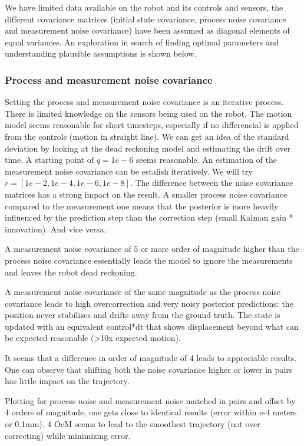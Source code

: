 \documentclass{article}
\begin{document}
We have limited data available on the robot and its controls and sensors, the different covariance matrices (initial state covariance, process noise covariance and measurement noise covariance) have been assumed as diagonal elements of equal variances. An exploration in search of finding optimal parameters and understanding plausible assumptions is shown below. 


\subsubsection{Process and measurement noise covariance}
Setting the process and measurement noise covariance is an iterative process. There is limited knowledge on the sensors being used on the robot. The motion model seems reasonable for short timesteps, especially if no differencial is applied from the controls (motion in straight line). We can get an idea of the standard deviation by looking at the dead reckoning model and estimating the drift over time.
A starting point of $q=1e-6$ seems reasonable.
An estimation of the measurement noise covariance can be estalish iteratively. We will try $r=[1e-2, 1e-4, 1e-6, 1e-8]$.
The difference between the noise covariance matrices has a strong impact on the result. A smaller process noise covariance compared to the measurement one means that the posterior is more heavily influenced by the prediction step than the correction step (small Kalman gain * innovation). And vice versa.

A measurement noise covariance of 5 or more order of magnitude higher than the process noise covariance essentially leads the model to ignore the measurements and leaves the robot dead reckoning.

A measurement noise covariance of the same magnitude as the process noise covariance leads to high overcorrection and very noisy posterior predictions: the position never stabilizes and drifts away from the ground truth. The state is updated with an equivalent control*dt that shows displacement beyond what can be expected reasonable (>10x expected motion).

It seems that a difference in order of magnitude of 4 leads to appreciable results. One can observe that shifting both the noise covariance higher or lower in pairs has little impact on the trajectory.

Plotting for process noise and measurement noise matched in pairs and offset by 4 orders of magnitude, one gets close to identical results (error within e-4 meters or 0.1mm). 4 OeM seems to lead to the smoothest trajectory (not over correcting) while minimizing error.
\end{document}
